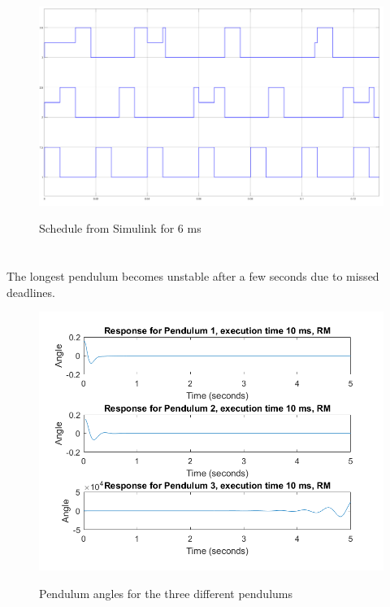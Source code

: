 \documentclass[12pt,a4paper]{article}
\begin{document}
    \begin{center}
      \begin{figure}
        \includegraphics[scale=0.2]{ex42.png}
        \label{fig:ex32}
      \caption{Schedule from Simulink for 6 ms}
      \end{figure}
    \end{center}


\section{} %
The longest pendulum becomes unstable after a few seconds due to missed deadlines.
\begin{center}
      \begin{figure}
        \includegraphics[scale=0.5]{ex531.png}
        \label{fig:ex31}
        \caption{Pendulum angles for the three different pendulums}
      \end{figure}
    \end{center}
    
\end{document}
